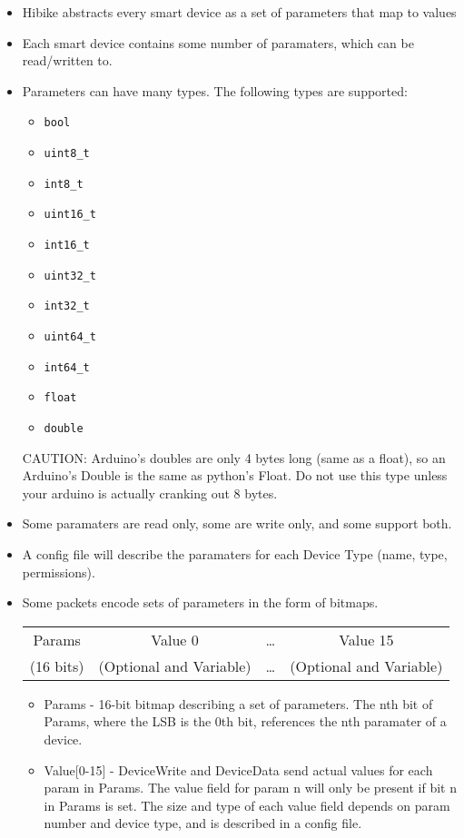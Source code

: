 \documentclass[12pt]{book}
\begin{document}
\begin{itemize}
	\item Hibike abstracts every smart device as a set of parameters that map to values
	\item Each smart device contains some number of paramaters, which can be read/written to.
	\item Parameters can have many types. The following types are supported:
	\begin{itemize}
		\item \texttt{bool}
		\item \texttt{uint8\_t}
		\item \texttt{int8\_t}
		\item \texttt{uint16\_t}
		\item \texttt{int16\_t}
		\item \texttt{uint32\_t}
		\item \texttt{int32\_t}
		\item \texttt{uint64\_t}
		\item \texttt{int64\_t}
		\item \texttt{float}
		\item \texttt{double}
	\end{itemize} CAUTION: Arduino's doubles are only 4 bytes long (same as a float), so an
	Arduino's Double is the same as python's Float. Do not use this type
	unless your arduino is actually cranking out 8 bytes.
	\item Some paramaters are read only, some are write only, and some support both.
	\item A config file will describe the paramaters for each Device Type (name, type, permissions).
	\item Some packets encode sets of parameters in the form of bitmaps.
	\begin{center}
		\begin{tabular}{|c|c |c| c|}
		\hline
		Params & Value 0 & \ldots & Value 15 \\
		(16 bits) & (Optional and Variable) & \ldots & (Optional and Variable) \\
		\hline
		\end{tabular}
	\end{center}
	\begin{itemize}
		\item Params - 16-bit bitmap describing a set of parameters. The nth bit of
		Params, where the LSB is the 0th bit, references the nth paramater of
  		a device.
		\item Value{[}0-15{]} - DeviceWrite and DeviceData send actual values for
  		each param in Params. The value field for param n will only be present
  		if bit n in Params is set. The size and type of each value field
  		depends on param number and device type, and is described in a config
  		file.
  	\end{itemize}
\end{itemize}
\end{document}
